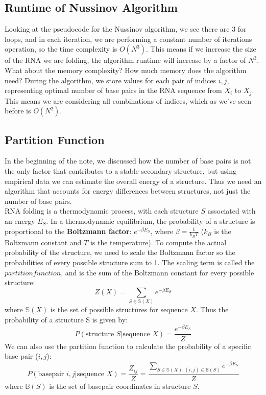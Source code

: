 \documentclass[12pt]{article}
\begin{document}
\subsection{Runtime of Nussinov Algorithm}
Looking at the pseudocode for the Nussinov algorithm, we see there are 3 for loops, and in each iteration, we are performing a constant number of iterations operation, so the time complexity is \textbf{$O(N^3)$}. This means if we increase the size of the RNA we are folding, the algorithm runtime will increase by a factor of $N^3$. What about the memory complexity? How much memory does the algorithm need? During the algorithm, we store values for each pair of indices $i, j$, representing optimal number of base pairs in the RNA sequence from $X_i$ to $X_j$. This means we are considering all combinations of indices, which as we've seen before is $O(N^2)$.
\subsection{Partition Function}
\label{partition}
In the beginning of the note, we discussed how the number of base pairs is not the only factor that contributes to a stable secondary structure, but using empirical data we can estimate the overall energy of a structure. Thus we need an algorithm that accounts for energy differences between structures, not just the number of base pairs.\\[10pt]
RNA folding is a thermodynamic process, with each structure $S$ associated with an energy $E_S$. In a thermodynamic equilibrium, the probability of a structure is proportional to the \textbf{Boltzmann factor}: $e^{-\beta E_S}$, where $\beta = \frac{1}{k_BT}$ ($k_B$ is the Boltzmann constant and $T$ is the temperature). To compute the actual probability of the structure, we need to scale the Boltzmann factor so the probabilities of every possible structure sum to 1. The scaling term is called the $partition function$, and is the sum of the Boltzmann constant for every possible structure:
$$Z\left(X\right) = \sum_{S\in \mathbb{S}(X)}e^{-\beta E_S}$$
where $\mathbb{S}(X)$ is the set of possible structures for sequence $X$. Thus the probability of a structure S is given by:
$$P(\text{structure } S | \text{sequence }X) = \frac{e^{-\beta E_S}}{Z}$$
We can also use the partition function to calculate the probability of a specific base pair ($i,j$):
$$P(\text{basepair } i,j | \text{sequence }X) = \frac{Z_{ij}}{Z} = \frac{\sum\limits_{S\in \mathbb{S}(X):(i,j)\in \mathbb{B}(S)}e^{-\beta E_S}}{Z}$$
where $\mathbb{B}(S)$ is the set of basepair coordinates in structure $S$.
\end{document}
